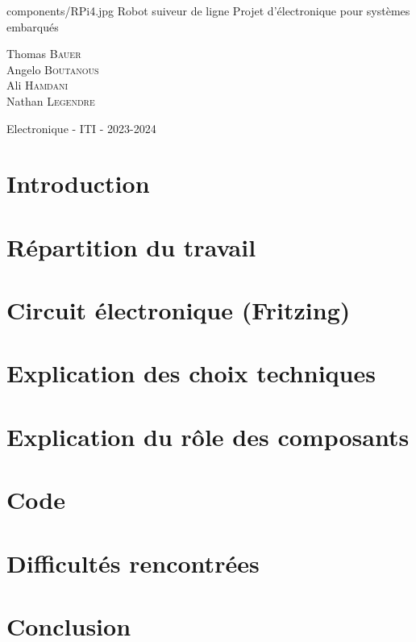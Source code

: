\documentclass[12pt,a4paper]{article}
\begin{document}
\PageDeGarde
{components/RPi4.jpg} %
{Robot suiveur de ligne} %
{Projet d'électronique pour systèmes embarqués} %
{

Thomas \textsc{Bauer}\\
Angelo \textsc{Boutanous}\\
Ali \textsc{Hamdani}\\
Nathan \textsc{Legendre}\\

} %
{Electronique - ITI - 2023-2024} %


\newpage

\tableofcontents

\newpage

\section*{Introduction}


\section{Répartition du travail}


\section{Circuit électronique (Fritzing)}


\section{Explication des choix techniques}


\section{Explication du rôle des composants}


\section{Code}


\section{Difficultés rencontrées}


\section{Conclusion}

\end{document}
